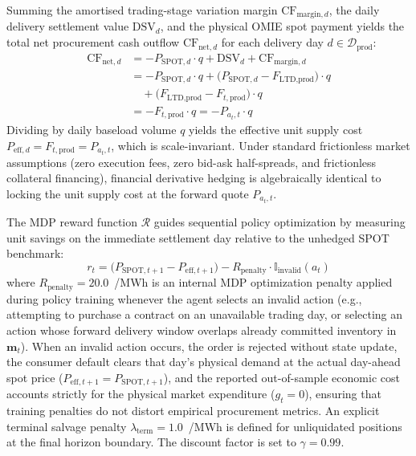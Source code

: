 Summing the amortised trading-stage variation margin $\text{CF}_{\text{margin}, d}$, the daily delivery settlement value $\text{DSV}_d$, and the physical OMIE spot payment yields the total net procurement cash outflow $\text{CF}_{\text{net}, d}$ for each delivery day $d \in \mathcal{D}_{\text{prod}}$:
\begin{equation}
\begin{aligned}
    \text{CF}_{\text{net}, d} &= - P_{\text{SPOT}, d} \cdot q + \text{DSV}_d + \text{CF}_{\text{margin}, d} \\
    &= - P_{\text{SPOT}, d} \cdot q + \big( P_{\text{SPOT}, d} - F_{\text{LTD}, \text{prod}} \big) \cdot q \\
    &\quad + \big( F_{\text{LTD}, \text{prod}} - F_{t, \text{prod}} \big) \cdot q \\
    &= - F_{t, \text{prod}} \cdot q = - P_{a_t, t} \cdot q
\end{aligned}
\label{eq:net_cashflow}
\end{equation}
Dividing by daily baseload volume $q$ yields the effective unit supply cost $P_{\text{eff}, d} = F_{t, \text{prod}} = P_{a_t, t}$, which is scale-invariant. Under standard frictionless market assumptions (zero execution fees, zero bid-ask half-spreads, and frictionless collateral financing), financial derivative hedging is algebraically identical to locking the unit supply cost at the forward quote $P_{a_t, t}$.

The MDP reward function $\mathcal{R}$ guides sequential policy optimization by measuring unit savings on the immediate settlement day relative to the unhedged SPOT benchmark:
\begin{equation}
    r_t = \big( P_{\text{SPOT}, t+1} - P_{\text{eff}, t+1} \big) - R_{\text{penalty}} \cdot \mathbb{I}_{\text{invalid}}(a_t)
    \label{eq:reward_formal}
\end{equation}
where $R_{\text{penalty}} = 20.0$~\texteuro/MWh is an internal MDP optimization penalty applied during policy training whenever the agent selects an invalid action (e.g., attempting to purchase a contract on an unavailable trading day, or selecting an action whose forward delivery window overlaps already committed inventory in $\mathbf{m}_t$). When an invalid action occurs, the order is rejected without state update, the consumer default clears that day's physical demand at the actual day-ahead spot price ($P_{\text{eff}, t+1} = P_{\text{SPOT}, t+1}$), and the reported out-of-sample economic cost accounts strictly for the physical market expenditure ($g_t = 0$), ensuring that training penalties do not distort empirical procurement metrics. An explicit terminal salvage penalty $\lambda_{\text{term}} = 1.0$~\texteuro/MWh is defined for unliquidated positions at the final horizon boundary. The discount factor is set to $\gamma = 0.99$.

